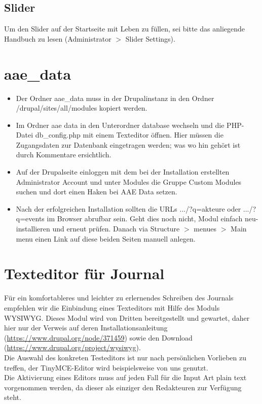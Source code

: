 \documentclass{swp}
\begin{document}
\subsection{Slider}
Um den Slider auf der Startseite mit Leben zu f\"ullen, sei bitte das anliegende Handbuch zu lesen (Administrator $>$ Slider Settings).
\section{aae\_{}data}
\begin{itemize}
\item Der Ordner \glqq aae\_{}data\grqq{} muss in der Drupalinstanz in den Ordner \glqq /drupal/sites/all/modules\grqq{} kopiert werden.
\item Im Ordner  \glqq aae data\grqq{} in den Unterordner \glqq database\grqq{} wechseln und die PHP-Datei \glqq db\_{}config.php\grqq{} mit einem Texteditor \"offnen. Hier m\"ussen die Zugangsdaten zur Datenbank eingetragen werden; was wo hin geh\"ort ist durch Kommentare ersichtlich.
\item Auf der Drupalseite einloggen mit dem bei der Installation erstellten Administrator Account und unter \glqq Modules\grqq{} die Gruppe \glqq Custom Modules\grqq{} suchen und dort einen Haken bei \glqq AAE Data\grqq{} setzen.
\item Nach der erfolgreichen Installation sollten die URLs .../?q=akteure oder .../?q=events im Browser abrufbar sein. Geht dies noch nicht, Modul einfach neu-installieren und erneut pr\"ufen. Danach via Structure $>$ menues $>$ Main menu einen Link auf diese beiden Seiten manuell anlegen.
\end{itemize}
\section{Texteditor f\"ur Journal}
F\"ur ein komfortableres und leichter zu erlernendes Schreiben des Journals empfehlen wir die Einbindung eines Texteditors mit Hilfe des Moduls \glqq WYSIWYG\grqq{}. Dieses Modul wird von Dritten bereitgestellt und gewartet, daher hier nur der Verweis auf deren Installationsanleitung (\url{https://www.drupal.org/node/371459}) sowie den Download (\url{https://www.drupal.org/project/wysiwyg}).\\
Die Auswahl des konkreten Testeditors ist nur nach pers\"onlichen Vorlieben zu treffen, der \glqq TinyMCE\grqq{}-Editor wird beispielsweise von uns genutzt.\\
Die Aktivierung eines Editors muss auf jeden Fall f\"ur die Input Art \glqq plain text\grqq{} vorgenommen werden, da dieser als einziger den Redakteuren zur Verf\"ugung steht.
\end{document}
